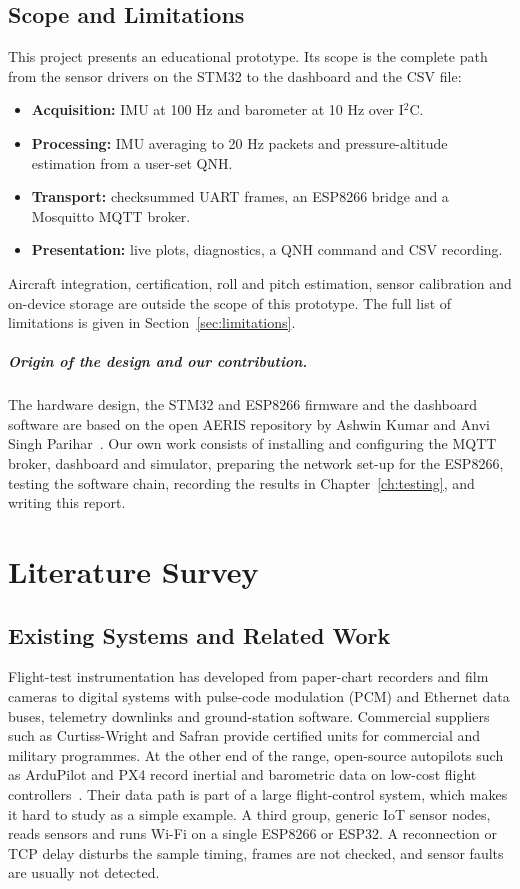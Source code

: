 \documentclass[12pt,a4paper]{report}
\begin{document}
\section{Scope and Limitations}
This project presents an educational prototype. Its scope is the complete path from the sensor drivers on the STM32 to the dashboard and the CSV file:
\begin{itemize}
\item \textbf{Acquisition:} IMU at 100 Hz and barometer at 10 Hz over I$^2$C.
\item \textbf{Processing:} IMU averaging to 20 Hz packets and pressure-altitude estimation from a user-set QNH.
\item \textbf{Transport:} checksummed UART frames, an ESP8266 bridge and a Mosquitto MQTT broker.
\item \textbf{Presentation:} live plots, diagnostics, a QNH command and CSV recording.
\end{itemize}
Aircraft integration, certification, roll and pitch estimation, sensor calibration and on-device storage are outside the scope of this prototype. The full list of limitations is given in Section~\ref{sec:limitations}.

\paragraph{Origin of the design and our contribution.} The hardware design, the STM32 and ESP8266 firmware and the dashboard software are based on the open AERIS repository by Ashwin Kumar and Anvi Singh Parihar~\cite{aeris}. Our own work consists of installing and configuring the MQTT broker, dashboard and simulator, preparing the network set-up for the ESP8266, testing the software chain, recording the results in Chapter~\ref{ch:testing}, and writing this report.

\chapter{Literature Survey}
\section{Existing Systems and Related Work}
Flight-test instrumentation has developed from paper-chart recorders and film cameras to digital systems with pulse-code modulation (PCM) and Ethernet data buses, telemetry downlinks and ground-station software. Commercial suppliers such as Curtiss-Wright and Safran provide certified units for commercial and military programmes. At the other end of the range, open-source autopilots such as ArduPilot and PX4 record inertial and barometric data on low-cost flight controllers~\cite{ardupilot}. Their data path is part of a large flight-control system, which makes it hard to study as a simple example. A third group, generic IoT sensor nodes, reads sensors and runs Wi-Fi on a single ESP8266 or ESP32. A reconnection or TCP delay disturbs the sample timing, frames are not checked, and sensor faults are usually not detected.
\end{document}
